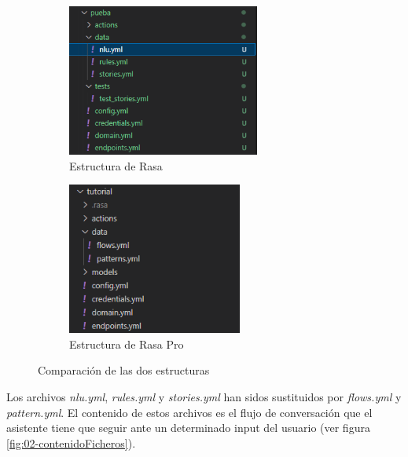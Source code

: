\documentclass[a4paper,11pt]{article}
\begin{document}
			\begin{figure}[H]
				\centering
				\begin{subfigure}{0.45\textwidth}
					\centering
					\includegraphics[height=5cm]{img/00-estructuraRasa.png}
					\caption{Estructura de Rasa}
				\end{subfigure}
				\hspace{0cm}
				\begin{subfigure}{0.45\textwidth}
					\centering
					\includegraphics[height=5cm]{img/01-estructuraRasaPro.png}
					\caption{Estructura de Rasa Pro}
				\end{subfigure}
				\caption{Comparación de las dos estructuras}
				\label{fig:01-comparacionEstructuras}
			\end{figure}
			
			Los archivos \textit{nlu.yml}, \textit{rules.yml} y \textit{stories.yml} han sidos sustituidos por \textit{flows.yml} y \textit{pattern.yml}. El contenido de estos archivos es el flujo de conversación que el asistente tiene que seguir ante un determinado input del usuario (ver figura \ref{fig:02-contenidoFicheros}).
			
\end{document}
